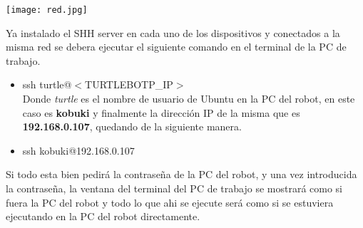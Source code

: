 \documentclass[12pt,a4paper]{article}
\begin{document}
\begin{itemize}
\begin{center}
\texttt{[image: red.jpg]}
\end{center}

Ya instalado el SHH server en cada uno de los dispositivos y conectados a la misma red se debera ejecutar el siguiente comando en el terminal de la PC de trabajo.
\begin{itemize}
\item ssh turtle@$<$TURTLEBOTP\_IP$>$\\
Donde \textit{turtle} es el nombre de usuario de Ubuntu en la PC del robot, en este caso es \textbf{kobuki} y finalmente la dirección IP de la misma que es \textbf{192.168.0.107}, quedando de la siguiente manera.
\item ssh kobuki@192.168.0.107
\end{itemize}
Si todo esta bien pedirá la contraseña de la PC del robot, y una vez introducida la contraseña, la ventana del terminal del PC de trabajo se mostrará como si fuera la PC del robot y todo lo que ahi se ejecute será como si se estuviera ejecutando en la PC del robot directamente.


\end{itemize}
\end{document}
